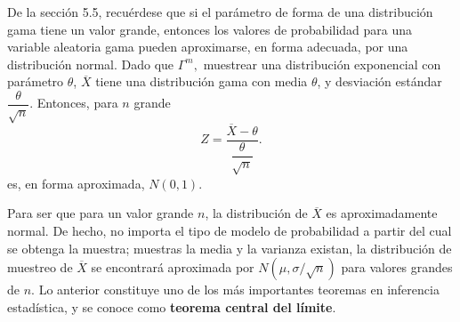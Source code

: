 De la sección 5.5, recuérdese que si el parámetro de forma de una distribución gama tiene un valor grande, entonces los valores de probabilidad para una variable aleatoria gama pueden aproximarse, en forma adecuada, por una distribución normal. Dado que $\Gamma^m,$ muestrear una distribución exponencial con parámetro $\theta$, $\overline{X}$ tiene una distribución gama con media $\theta$, y desviación estándar $\dfrac{\theta}{\sqrt{n}}$. Entonces, para $n$ grande
$$Z=\dfrac{\overline{X}-\theta}{\dfrac{\theta}{\sqrt{n}}}.$$
es, en forma aproximada, $N(0,1)$.

Para ser que para un valor grande $n$, la distribución de $\overline{X}$ es aproximadamente normal. De hecho, no importa el tipo de modelo de probabilidad a partir del cual se obtenga la muestra; muestras la media y la varianza existan, la distribución de muestreo de $\overline{X}$ se encontrará aproximada por $N\left(\mu, \sigma/\sqrt{n}\right)$ para valores grandes de $n$. Lo anterior constituye uno de los más importantes teoremas en inferencia estadística, y se conoce como \textbf{teorema central del límite}.

